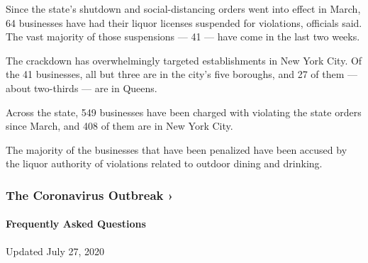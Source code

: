 Since the state's shutdown and social-distancing orders went into effect
in March, 64 businesses have had their liquor licenses suspended for
violations, officials said. The vast majority of those suspensions ---
41 --- have come in the last two weeks.

The crackdown has overwhelmingly targeted establishments in New York
City. Of the 41 businesses, all but three are in the city's five
boroughs, and 27 of them --- about two-thirds --- are in Queens.

Across the state, 549 businesses have been charged with violating the
state orders since March, and 408 of them are in New York City.

The majority of the businesses that have been penalized have been
accused by the liquor authority of violations related to outdoor dining
and drinking.

\href{https://www.nytimes3xbfgragh.onion/news-event/coronavirus?action=click\&pgtype=Article\&state=default\&region=MAIN_CONTENT_3\&context=storylines_faq}{}

\hypertarget{the-coronavirus-outbreak-}{%
\subsubsection{The Coronavirus Outbreak
›}\label{the-coronavirus-outbreak-}}

\hypertarget{frequently-asked-questions}{%
\paragraph{Frequently Asked
Questions}\label{frequently-asked-questions}}

Updated July 27, 2020

